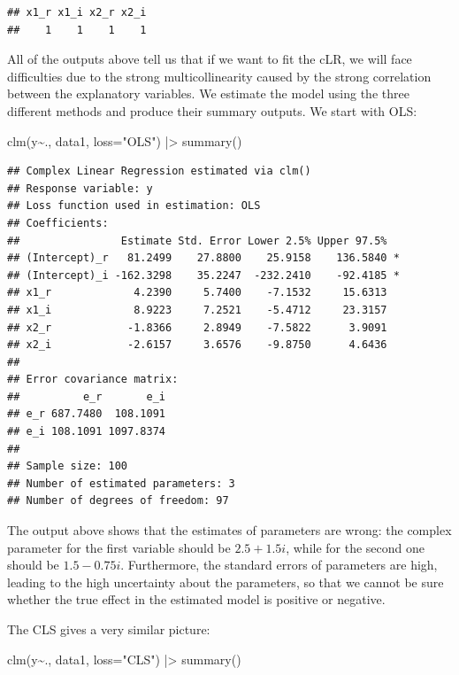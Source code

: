 \documentclass[
]{book}
\newenvironment{Shaded}{\begin{snugshade}}{\end{snugshade}}
\newcommand{\AttributeTok}[1]{\textcolor[rgb]{0.77,0.63,0.00}{#1}}
\newcommand{\FunctionTok}[1]{\textcolor[rgb]{0.00,0.00,0.00}{#1}}
\newcommand{\NormalTok}[1]{#1}
\newcommand{\SpecialCharTok}[1]{\textcolor[rgb]{0.00,0.00,0.00}{#1}}
\newcommand{\StringTok}[1]{\textcolor[rgb]{0.31,0.60,0.02}{#1}}
\begin{document}
\begin{verbatim}
## x1_r x1_i x2_r x2_i 
##    1    1    1    1
\end{verbatim}

All of the outputs above tell us that if we want to fit the cLR, we will face difficulties due to the strong multicollinearity caused by the strong correlation between the explanatory variables. We estimate the model using the three different methods and produce their summary outputs. We start with OLS:

\begin{Shaded}
\begin{Highlighting}[]
\FunctionTok{clm}\NormalTok{(y}\SpecialCharTok{\textasciitilde{}}\NormalTok{., data1, }\AttributeTok{loss=}\StringTok{"OLS"}\NormalTok{) }\SpecialCharTok{|\textgreater{}}
    \FunctionTok{summary}\NormalTok{()}
\end{Highlighting}
\end{Shaded}

\begin{verbatim}
## Complex Linear Regression estimated via clm()
## Response variable: y
## Loss function used in estimation: OLS
## Coefficients:
##                Estimate Std. Error Lower 2.5% Upper 97.5%  
## (Intercept)_r   81.2499    27.8800    25.9158    136.5840 *
## (Intercept)_i -162.3298    35.2247  -232.2410    -92.4185 *
## x1_r             4.2390     5.7400    -7.1532     15.6313  
## x1_i             8.9223     7.2521    -5.4712     23.3157  
## x2_r            -1.8366     2.8949    -7.5822      3.9091  
## x2_i            -2.6157     3.6576    -9.8750      4.6436  
## 
## Error covariance matrix:
##          e_r       e_i
## e_r 687.7480  108.1091
## e_i 108.1091 1097.8374
## 
## Sample size: 100
## Number of estimated parameters: 3
## Number of degrees of freedom: 97
\end{verbatim}

The output above shows that the estimates of parameters are wrong: the complex parameter for the first variable should be \(2.5 + 1.5i\), while for the second one should be \(1.5 - 0.75i\). Furthermore, the standard errors of parameters are high, leading to the high uncertainty about the parameters, so that we cannot be sure whether the true effect in the estimated model is positive or negative.

The CLS gives a very similar picture:

\begin{Shaded}
\begin{Highlighting}[]
\FunctionTok{clm}\NormalTok{(y}\SpecialCharTok{\textasciitilde{}}\NormalTok{., data1, }\AttributeTok{loss=}\StringTok{"CLS"}\NormalTok{) }\SpecialCharTok{|\textgreater{}}
    \FunctionTok{summary}\NormalTok{()}
\end{Highlighting}
\end{Shaded}
\end{document}
